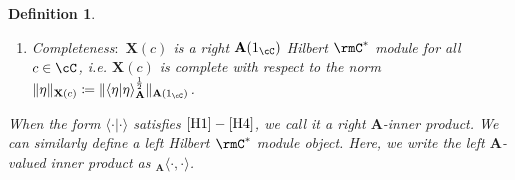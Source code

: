 \documentclass[11pt,reqno]{amsart}
\newcommand{\bb}[1]{\mathbf{#1}}
\numberwithin{equation}{section}
\theoremstyle{plain}
\newtheorem{defn}[thm]{Definition}
\begin{document}
\begin{defn}
\begin{enumerate}[label=\textup{(H\arabic*)}]
\begin{center}
\end{center}
We denote this diagram by $\langle \xi | \xi \rangle_{\bb A}$.

\item \label{H4} Completeness$\colon$ $\bb X(c)$ is a right $\bb A(1_\cC)$ Hilbert $\rmC^*$ module for all $c \in \cC$, i.e. $\bb X(c)$ is complete with respect to the norm $\|\eta\|_{\bb X(c)} \coloneq \|\langle \eta | \eta \rangle_{\bb A}^\frac{1}{2}\|_{\bb A(1_{\cC})}$.
\end{enumerate}
When the form $\langle \cdot | \cdot \rangle$ satisfies $\ref{H1}-\ref{H4}$, we call it a right $\bb A$-inner product.
We can similarly define a left Hilbert $\rmC^*$ module object.
Here, we write the left $\bb A$-valued inner product as $_{\bb A} \langle \cdot, \cdot \rangle$.
\end{defn}
\end{document}
